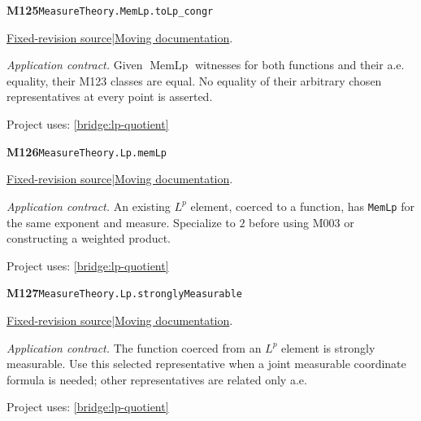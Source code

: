 \documentclass[11pt,a4paper]{article}
\theoremstyle{definition}
\theoremstyle{remark}
\begin{document}
\noindent\textbf{M125}\label{base:M125}\quad\nolinkurl{MeasureTheory.MemLp.toLp_congr}

\href{https://github.com/leanprover-community/mathlib4/blob/9bac2d0692944a775113f7c130fd5e5b4608a854/Mathlib/MeasureTheory/Function/LpSpace/Basic.lean}{Fixed-revision source}\quad|\quad\href{https://leanprover-community.github.io/mathlib4_docs/Mathlib/MeasureTheory/Function/LpSpace/Basic.html#MeasureTheory.MemLp.toLp_congr}{Moving documentation}.\par
\noindent\textit{Application contract.} Given $\operatorname{MemLp}$ witnesses for both functions and their a.e. equality, their M123 classes are equal. No equality of their arbitrary chosen representatives at every point is asserted.\par
{\small Project uses: \ref{bridge:lp-quotient}}\par\medskip

\noindent\textbf{M126}\label{base:M126}\quad\nolinkurl{MeasureTheory.Lp.memLp}

\href{https://github.com/leanprover-community/mathlib4/blob/9bac2d0692944a775113f7c130fd5e5b4608a854/Mathlib/MeasureTheory/Function/LpSpace/Basic.lean}{Fixed-revision source}\quad|\quad\href{https://leanprover-community.github.io/mathlib4_docs/Mathlib/MeasureTheory/Function/LpSpace/Basic.html#MeasureTheory.Lp.memLp}{Moving documentation}.\par
\noindent\textit{Application contract.} An existing $L^p$ element, coerced to a function, has \nolinkurl{MemLp} for the same exponent and measure. Specialize to $2$ before using M003 or constructing a weighted product.\par
{\small Project uses: \ref{bridge:lp-quotient}}\par\medskip

\noindent\textbf{M127}\label{base:M127}\quad\nolinkurl{MeasureTheory.Lp.stronglyMeasurable}

\href{https://github.com/leanprover-community/mathlib4/blob/9bac2d0692944a775113f7c130fd5e5b4608a854/Mathlib/MeasureTheory/Function/LpSpace/Basic.lean}{Fixed-revision source}\quad|\quad\href{https://leanprover-community.github.io/mathlib4_docs/Mathlib/MeasureTheory/Function/LpSpace/Basic.html#MeasureTheory.Lp.stronglyMeasurable}{Moving documentation}.\par
\noindent\textit{Application contract.} The function coerced from an $L^p$ element is strongly measurable. Use this selected representative when a joint measurable coordinate formula is needed; other representatives are related only a.e.\par
{\small Project uses: \ref{bridge:lp-quotient}}\par\medskip
\end{document}
